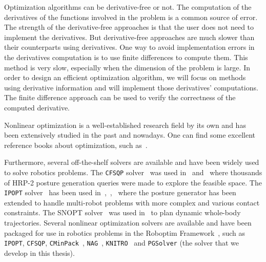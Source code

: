 Optimization algorithms can be derivative-free or not.
The computation of the derivatives of the functions involved in the problem is a common source of error.
The strength of the derivative-free approaches is that the user does not need to implement the derivatives.
But derivative-free approaches are much slower than their counterparts using derivatives.
One way to avoid implementation errors in the derivatives computation is to use finite differences to compute them.
This method is very slow, especially when the dimension of the problem is large.
In order to design an efficient optimization algorithm, we will focus on methods using derivative information and will implement those derivatives' computations.
The finite difference approach can be used to verify the correctness of the computed derivative.

Nonlinear optimization is a well-established research field by its own and has been extensively studied in the past and nowadays.
One can find some excellent reference books about optimization, such as~\cite{nocedal:book:2006, bonnans:book:2003, boyd2004convex}.

Furthermore, several off-the-shelf solvers are available and have been widely used to solve robotics problems.
The {\tt CFSQP} solver~\cite{cfsqp:manual} was used in~\cite{escande:iros:2009} and~\cite{escande:ras:2013} where thousands of HRP-2 posture generation queries were made to explore the feasible space.
The {\tt IPOPT} solver~\cite{wachter:mathprog:2006} has been used in~\cite{vaillant:humanoids:2014},~\cite{vaillant:autonomousrobots:2016},~\cite{bouyarmane:ar:2012} where the posture generator has been extended to handle multi-robot problems with more complex and various contact constraints.
The SNOPT solver~\cite{gill2005snopt} was used in~\cite{dai2014whole} to plan dynamic whole-body trajectories.
Several nonlinear optimization solvers are available and have been packaged for use in robotics problems in the Roboptim Framework~\cite{moulard:jsme:2013}, such as {\tt IPOPT}, {\tt CFSQP}, {\tt CMinPack}~\cite{cminpack}, {\tt NAG}~\cite{nag}, {\tt KNITRO}~\cite{knitro} and {\tt PGSolver} (the solver that we develop in this thesis).

